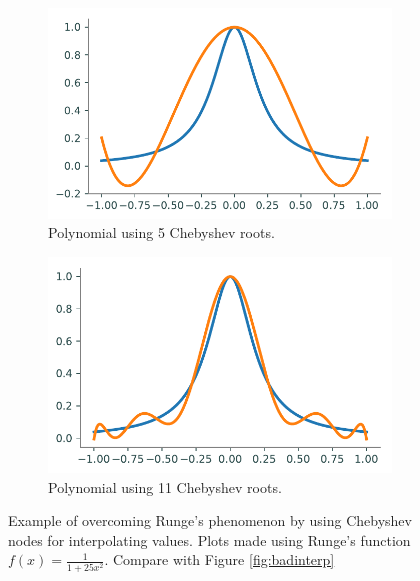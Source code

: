 \begin{figure}[H]
\captionsetup[subfigure]{justification=centering}
\captionsetup{justification=centering}
\centering
\begin{subfigure}{.5\textwidth}
    \centering
    \includegraphics[width=\linewidth]{figures/good_interp1.pdf}
    \caption{Polynomial using 5 Chebyshev roots.}
    \label{fig:good1}
\end{subfigure}%
\begin{subfigure}{.5\textwidth}
    \centering
    \includegraphics[width=\linewidth]{figures/good_interp2.pdf}
    \caption{Polynomial using 11 Chebyshev roots.}
    \label{fig:good2}
\end{subfigure}
\caption{Example of overcoming Runge's phenomenon by using Chebyshev nodes for interpolating values.
Plots made using Runge's function $f(x)=\frac{1}{1+25x^2}$.
Compare with Figure \ref{fig:badinterp}}
\label{fig:goodinterp}
\end{figure}

